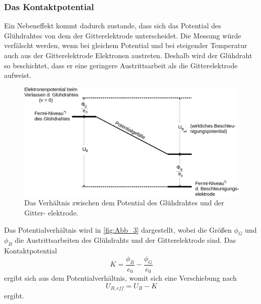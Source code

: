 \subsubsection{Das Kontaktpotential}
\label{subsubsec: Kontaktpotential}
Ein Nebeneffekt kommt dadurch zustande, dass sich das Potential des Glühdrahtes von dem der Gitterelektrode unterscheidet.
Die Messung würde verfälscht werden, wenn bei gleichem Potential und bei steigender Temperatur auch aus der Gitterelektrode Elektronen austreten.
Deshalb wird der Glühdraht so beschichtet, dass er eine geringere Austrittsarbeit als die Gitterelektrode aufweist.
\begin{figure}[H]
    \centering
    \includegraphics[width=\textwidth]{build/Abb_3.png}
    \caption{Das Verhältnis zwischen dem Potential des Glühdrahtes und der Gitter-
    elektrode\cite{V601}.}
    \label{fig:Abb_3}
\end{figure}
Das Potentialverhältnis wird in \autoref{fig:Abb_3} dargestellt, wobei die Größen $\phi_G$ und $\phi_B$ die Austrittsarbeiten des Glühdrahts und
der Gitterelektrode sind.
Das Kontaktpotential 
\begin{equation*}
    K = \frac{\phi_B}{e_0} - \frac{\phi_G}{e_0}
    \label{eqn:Kontaktpotential}
\end{equation*}
ergibt sich aus dem Potentialverhältnis, womit sich eine Verschiebung nach
\begin{equation}
    U_{B,eff} = U_B - K
    \label{eqn:Verschiebung}
\end{equation}
ergibt.


